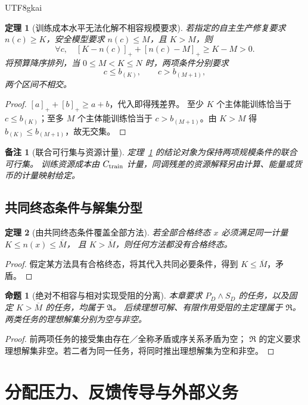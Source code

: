 \documentclass[12pt,a4paper,openany]{report}
\newtheorem{theorem}{定理}[chapter]
\newtheorem{proposition}{命题}[chapter]
\newtheorem{remark}{备注}[chapter]
\numberwithin{equation}{chapter}
\newcommand{\pos}[1]{\left[#1\right]_+}
\begin{document}
\begin{CJK*}{UTF8}{gkai}
\begin{theorem}[训练成本水平无法化解不相容规模要求]
\label{thm:training-incompatibility}
若指定的自主生产修复要求 $n(c)\ge K$，安全模型要求 $n(c)\le M$，且 $K>M$，则
\[
 \forall c,\quad
 \pos{K-n(c)}+\pos{n(c)-M}\ge K-M>0.
\]
将预算降序排列，当 $0\le M<K\le N$ 时，两项条件分别要求
\[
 c\le b_{(K)},\qquad c>b_{(M+1)},
\]
两个区间不相交。
\end{theorem}
\begin{proof}
$[a]_++[b]_+\ge a+b$，代入即得残差界。
至少 $K$ 个主体能训练恰当于 $c\le b_{(K)}$；至多 $M$ 个主体能训练恰当于
$c>b_{(M+1)}$。由 $K>M$ 得 $b_{(K)}\le b_{(M+1)}$，故无交集。
\end{proof}

\begin{remark}[联合可行集与资源计量]
定理~\ref{thm:training-incompatibility} 的结论对象为保持两项规模条件的联合可行集。
训练资源成本由 $C_{\rm train}$ 计量，同调残差的资源解释另由计算、能量或货币的计量映射给定。
\end{remark}

\section{共同终态条件与解集分型}

\begin{theorem}[由共同终态条件覆盖全部方法]
若全部合格终态 $x$ 必须满足同一计量 $K\le n(x)\le\overline M$，
且 $K>\overline M$，则任何方法都没有合格终态。
\end{theorem}
\begin{proof}
假定某方法具有合格终态，将其代入共同必要条件，得到 $K\le\overline M$，矛盾。
\end{proof}

\begin{proposition}[绝对不相容与相对实现受阻的分离]
本章要求 $P_D\land S_D$ 的任务，以及固定 $K>\overline M$ 的任务，均属于 $\mathfrak A$。
后续理想可解、有限作用受阻的主定理属于 $\mathfrak R$。
两类任务的理想解集分别为空与非空。
\end{proposition}
\begin{proof}
前两项任务的接受集由存在／全称矛盾或序关系矛盾为空；
$\mathfrak R$ 的定义要求理想解集非空。若二者为同一任务，将同时推出理想解集为空和非空。
\end{proof}

\chapter{分配压力、反馈传导与外部义务}
\label{chap:political}


\end{CJK*}
\end{document}

